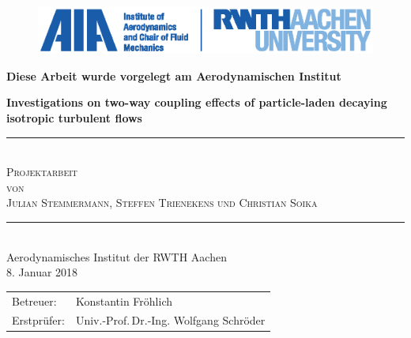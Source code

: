\documentclass[11pt,a4paper,openany,oneside,parskip=half*]{article}
\newcommand{\HRule}{\rule{\linewidth}{0.5mm}}  %
\begin{document}
\begin{titlepage}
\begin{figure}[htp]
\vspace*{-3cm} 
\hspace*{2.7cm}  
\includegraphics{./Titelseite/rwth_aia_en_rgb.eps}
\end{figure}
\begin{center}
\textbf{Diese Arbeit wurde vorgelegt am Aerodynamischen Institut}
\end{center}
\begin{center} %
\vspace*{4.2cm} %
{ \huge \bfseries Investigations on two-way coupling effects of particle-laden decaying isotropic turbulent flows}\\[0.3cm] %
\HRule \\[0.5cm] %
\textsc{\Large{Projektarbeit}}\\ %
\textsc{\Large{von}}\\
\textsc{\LARGE{Julian Stemmermann, Steffen Trienekens und Christian Soika}}\\[0.5cm]
\HRule \\[0.4cm]
{\Large{Aerodynamisches Institut der RWTH Aachen}}\\[.5cm]
{\large 8. Januar 2018} \\[1.5cm] %
\vfill %
\begin{flushleft} \large  %
\begin{tabular}{ll} %
Betreuer: &Konstantin Fr\"ohlich \\
Erstpr\"ufer: &Univ.-Prof.\,Dr.-Ing. Wolfgang Schr\"oder
\end{tabular}
\end{flushleft}
\vfill %
\end{center}
\end{titlepage}

\end{document}
